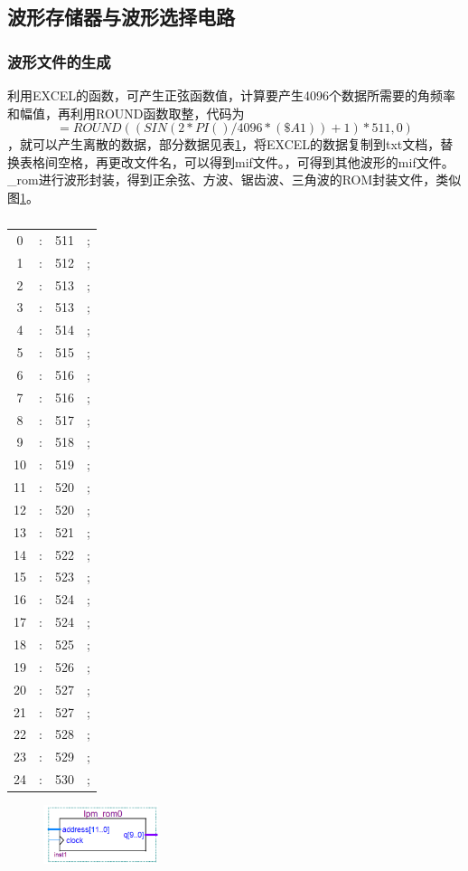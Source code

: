 \documentclass[12pt]{article}
\begin{document}
\subsection{波形存储器与波形选择电路}
\subsubsection{波形文件的生成}
利用EXCEL的函数，可产生正弦函数值，计算要产生4096个数据所需要的角频率和幅值，再利用ROUND函数取整，代码为$$=ROUND((SIN(2*PI()/4096*(\$A1))+1)*511,0)$$，就可以产生离散的数据，部分数据见表\ref{tab:sin}，将EXCEL的数据复制到txt文档，替换表格间空格，再更改文件名，可以得到mif文件。，可得到其他波形的mif文件。\_rom进行波形封装，得到正余弦、方波、锯齿波、三角波的ROM封装文件，类似图\ref{fig:sin}。
\begin{table}[htbp]
\centering
\caption{}
\label{tab:sin}
\begin{tabular}{cccc}
\hline
0  & : & 511 & ; \\
1  & : & 512 & ; \\
2  & : & 513 & ; \\
3  & : & 513 & ; \\
4  & : & 514 & ; \\
5  & : & 515 & ; \\
6  & : & 516 & ; \\
7  & : & 516 & ; \\
8  & : & 517 & ; \\
9  & : & 518 & ; \\
10 & : & 519 & ; \\
11 & : & 520 & ; \\
12 & : & 520 & ; \\
13 & : & 521 & ; \\
14 & : & 522 & ; \\
15 & : & 523 & ; \\
16 & : & 524 & ; \\
17 & : & 524 & ; \\
18 & : & 525 & ; \\
19 & : & 526 & ; \\
20 & : & 527 & ; \\
21 & : & 527 & ; \\
22 & : & 528 & ; \\
23 & : & 529 & ; \\
24 & : & 530 & ;\\\hline
\end{tabular}
\end{table}
\begin{figure}[hp]
	\centering  
	\includegraphics[width=0.3\textwidth]{picture/sin.png} 
	\caption{}
	\label{fig:sin}   
\end{figure}
\end{document}
